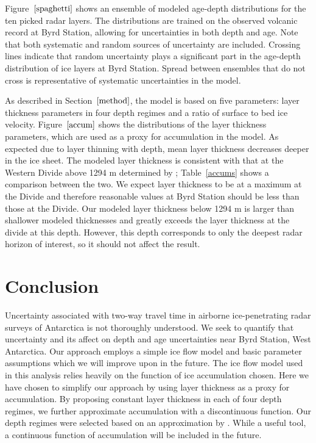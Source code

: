 \documentclass[12pt]{article}
\begin{document}
Figure~$\ref{spaghetti}$ shows an ensemble of modeled age-depth distributions for the ten picked radar layers. The distributions are trained on the observed volcanic record at Byrd Station, allowing for uncertainties in both depth and age. Note that both systematic and random sources of uncertainty are included. Crossing lines indicate that random uncertainty plays a significant part in the age-depth distribution of ice layers at Byrd Station. Spread between ensembles that do not cross is representative of systematic uncertainties in the model. 

As described in Section~$\ref{method}$, the model is based on five parameters: layer thickness parameters in four depth regimes and a ratio of surface to bed ice velocity. Figure~$\ref{accum}$ shows the distributions of the layer thickness parameters, which are used as a proxy for accumulation in the model. As expected due to layer thinning with depth, mean layer thickness decreases deeper in the ice sheet. The modeled layer thickness is consistent with that at the Western Divide above 1294 m determined by \citep{neumann08}; Table~\ref{accums} shows a comparison between the two. We expect layer thickness to be at a maximum at the Divide and therefore reasonable values at Byrd Station should be less than those at the Divide. Our modeled layer thickness below 1294 m is larger than shallower modeled thicknesses and greatly exceeds the layer thickness at the divide at this depth. However, this depth corresponds to only the deepest radar horizon of interest, so it should not affect the result.

\section{Conclusion}
Uncertainty associated with two-way travel time in airborne ice-penetrating radar surveys of Antarctica is not thoroughly understood. We seek to quantify that uncertainty and its affect on depth and age uncertainties near Byrd Station, West Antarctica. Our approach employs a simple ice flow model and basic parameter assumptions which we will improve upon in the future. The ice flow model used in this analysis relies heavily on the function of ice accumulation chosen. Here we have chosen to simplify our approach by using layer thickness as a proxy for accumulation. By proposing constant layer thickness in each of four depth regimes, we further approximate accumulation with a discontinuous function. Our depth regimes were selected based on an approximation by \citet{hammer94}. While a useful tool, a continuous function of accumulation will be included in the future.
\end{document}
